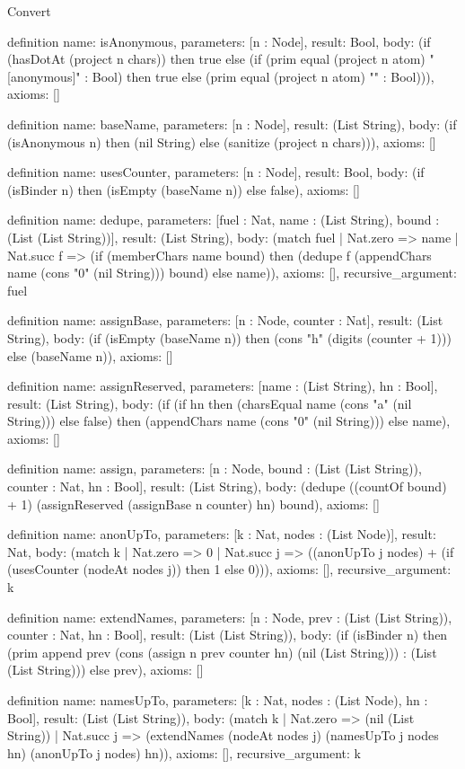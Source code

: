 \begin{lexlean}{Convert}
\begin{semanticmodule}
definition{
  name: isAnonymous,
  parameters: [n : Node],
  result: Bool,
  body: (if (hasDotAt (project n chars)) then true else (if (prim equal (project n atom) "[anonymous]" : Bool) then true else (prim equal (project n atom) "" : Bool))),
  axioms: []
}

definition{
  name: baseName,
  parameters: [n : Node],
  result: (List String),
  body: (if (isAnonymous n) then (nil String) else (sanitize (project n chars))),
  axioms: []
}

definition{
  name: usesCounter,
  parameters: [n : Node],
  result: Bool,
  body: (if (isBinder n) then (isEmpty (baseName n)) else false),
  axioms: []
}

definition{
  name: dedupe,
  parameters: [fuel : Nat, name : (List String), bound : (List (List String))],
  result: (List String),
  body: (match fuel
    | Nat.zero => name
    | Nat.succ f => (if (memberChars name bound) then (dedupe f (appendChars name (cons "0" (nil String))) bound) else name)),
  axioms: [],
  recursive_argument: fuel
}

definition{
  name: assignBase,
  parameters: [n : Node, counter : Nat],
  result: (List String),
  body: (if (isEmpty (baseName n)) then (cons "h" (digits (counter + 1))) else (baseName n)),
  axioms: []
}

definition{
  name: assignReserved,
  parameters: [name : (List String), hn : Bool],
  result: (List String),
  body: (if (if hn then (charsEqual name (cons "a" (nil String))) else false) then (appendChars name (cons "0" (nil String))) else name),
  axioms: []
}

definition{
  name: assign,
  parameters: [n : Node, bound : (List (List String)), counter : Nat, hn : Bool],
  result: (List String),
  body: (dedupe ((countOf bound) + 1) (assignReserved (assignBase n counter) hn) bound),
  axioms: []
}

definition{
  name: anonUpTo,
  parameters: [k : Nat, nodes : (List Node)],
  result: Nat,
  body: (match k
    | Nat.zero => 0
    | Nat.succ j => ((anonUpTo j nodes) + (if (usesCounter (nodeAt nodes j)) then 1 else 0))),
  axioms: [],
  recursive_argument: k
}

definition{
  name: extendNames,
  parameters: [n : Node, prev : (List (List String)), counter : Nat, hn : Bool],
  result: (List (List String)),
  body: (if (isBinder n) then (prim append prev (cons (assign n prev counter hn) (nil (List String))) : (List (List String))) else prev),
  axioms: []
}

definition{
  name: namesUpTo,
  parameters: [k : Nat, nodes : (List Node), hn : Bool],
  result: (List (List String)),
  body: (match k
    | Nat.zero => (nil (List String))
    | Nat.succ j => (extendNames (nodeAt nodes j) (namesUpTo j nodes hn) (anonUpTo j nodes) hn)),
  axioms: [],
  recursive_argument: k
}


\end{semanticmodule}
\end{lexlean}
